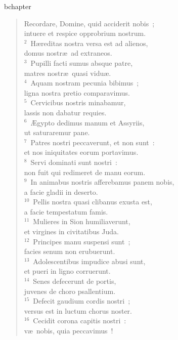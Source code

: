 bchapter\begin{flushleft}\begin{verse}\vspace{-19pt}Recordare, Domine, quid acciderit nobis~;\\ intuere et respice opprobrium nostrum.\\
${}^{2}$~H\ae reditas nostra versa est ad alienos,\\ domus nostr\ae\ ad extraneos.\\
${}^{3}$~Pupilli facti sumus absque patre,\\ matres nostr\ae\ quasi vidu\ae .\\
${}^{4}$~Aquam nostram pecunia bibimus~;\\ ligna nostra pretio comparavimus.\\
${}^{5}$~Cervicibus nostris minabamur,\\ lassis non dabatur requies.\\
${}^{6}$~\AE gypto dedimus manum et Assyriis,\\ ut saturaremur pane.\\
${}^{7}$~Patres nostri peccaverunt, et non sunt~:\\ et nos iniquitates eorum portavimus.\\
${}^{8}$~Servi dominati sunt nostri~:\\ non fuit qui redimeret de manu eorum.\\
${}^{9}$~In animabus nostris afferebamus panem nobis,\\ a facie gladii in deserto.\\
${}^{10}$~Pellis nostra quasi clibanus exusta est,\\ a facie tempestatum famis.\\
${}^{11}$~Mulieres in Sion humiliaverunt,\\ et virgines in civitatibus Juda.\\
${}^{12}$~Principes manu suspensi sunt~;\\ facies senum non erubuerunt.\\
${}^{13}$~Adolescentibus impudice abusi sunt,\\ et pueri in ligno corruerunt.\\
${}^{14}$~Senes defecerunt de portis,\\ juvenes de choro psallentium.\\
${}^{15}$~Defecit gaudium cordis nostri~;\\ versus est in luctum chorus noster.\\
${}^{16}$~Cecidit corona capitis nostri~:\\ v\ae\ nobis, quia peccavimus~!\\

\end{verse}
\end{flushleft}
